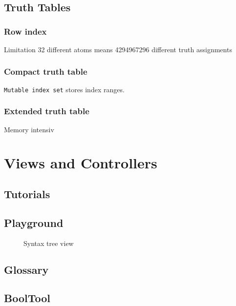 \subsection{Truth Tables}

\subsubsection{Row index}

Limitation 32 different atoms means 4294967296 different truth assignments

\subsubsection{Compact truth table}

\verb+Mutable index set+ stores index ranges.

\subsubsection{Extended truth table}

Memory intensiv

\section{Views and Controllers}

\subsection{Tutorials}

\subsection{Playground}

\begin{figure}[htbp]
\begin{center}
\caption{Syntax tree view}
\label{fig:TreeView}
\end{center}
\end{figure}

\subsection{Glossary}

\subsection{BoolTool}




